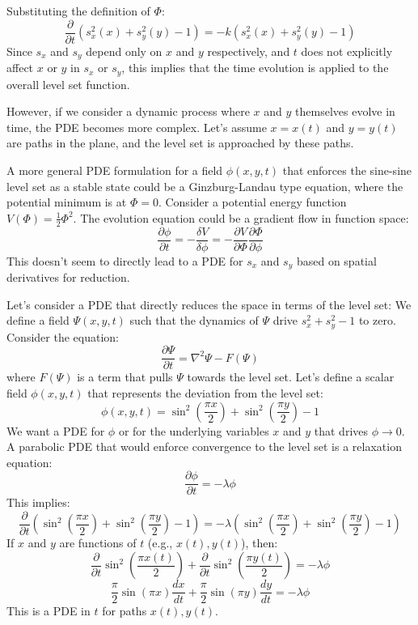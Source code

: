 ﻿\documentclass[12pt]{article}
\begin{document}
Substituting the definition of $\Phi$:
$$ \frac{\partial}{\partial t} (s_x^2(x) + s_y^2(y) - 1) = -k (s_x^2(x) + s_y^2(y) - 1) $$
Since $s_x$ and $s_y$ depend only on $x$ and $y$ respectively, and $t$ does not explicitly affect $x$ or $y$ in $s_x$ or $s_y$, this implies that the time evolution is applied to the overall level set function.

However, if we consider a dynamic process where $x$ and $y$ themselves evolve in time, the PDE becomes more complex. Let's assume $x=x(t)$ and $y=y(t)$ are paths in the plane, and the level set is approached by these paths.

A more general PDE formulation for a field $\phi(x,y,t)$ that enforces the sine-sine level set as a stable state could be a Ginzburg-Landau type equation, where the potential minimum is at $\Phi=0$.
Consider a potential energy function $V(\Phi) = \frac{1}{2} \Phi^2$. The evolution equation could be a gradient flow in function space:
$$ \frac{\partial \phi}{\partial t} = - \frac{\delta V}{\delta \phi} = - \frac{\partial V}{\partial \Phi} \frac{\partial \Phi}{\partial \phi} $$
This doesn't seem to directly lead to a PDE for $s_x$ and $s_y$ based on spatial derivatives for reduction.

Let's consider a PDE that directly reduces the space in terms of the level set:
We define a field $\Psi(x,y,t)$ such that the dynamics of $\Psi$ drive $s_x^2 + s_y^2 - 1$ to zero.
Consider the equation:
$$ \frac{\partial \Psi}{\partial t} = \nabla^2 \Psi - F(\Psi) $$
where $F(\Psi)$ is a term that pulls $\Psi$ towards the level set.
Let's define a scalar field $\phi(x,y,t)$ that represents the deviation from the level set:
$$ \phi(x,y,t) = \sin^2\left(\frac{\pi x}{2}\right) + \sin^2\left(\frac{\pi y}{2}\right) - 1 $$
We want a PDE for $\phi$ or for the underlying variables $x$ and $y$ that drives $\phi \to 0$.
A parabolic PDE that would enforce convergence to the level set is a relaxation equation:
$$ \frac{\partial \phi}{\partial t} = - \lambda \phi $$
This implies:
$$ \frac{\partial}{\partial t} \left( \sin^2\left(\frac{\pi x}{2}\right) + \sin^2\left(\frac{\pi y}{2}\right) - 1 \right) = - \lambda \left( \sin^2\left(\frac{\pi x}{2}\right) + \sin^2\left(\frac{\pi y}{2}\right) - 1 \right) $$
If $x$ and $y$ are functions of $t$ (e.g., $x(t), y(t)$), then:
$$ \frac{\partial}{\partial t} \sin^2\left(\frac{\pi x(t)}{2}\right) + \frac{\partial}{\partial t} \sin^2\left(\frac{\pi y(t)}{2}\right) = - \lambda \phi $$
$$ \frac{\pi}{2} \sin(\pi x) \frac{dx}{dt} + \frac{\pi}{2} \sin(\pi y) \frac{dy}{dt} = - \lambda \phi $$
This is a PDE in $t$ for paths $x(t), y(t)$.
\end{document}
